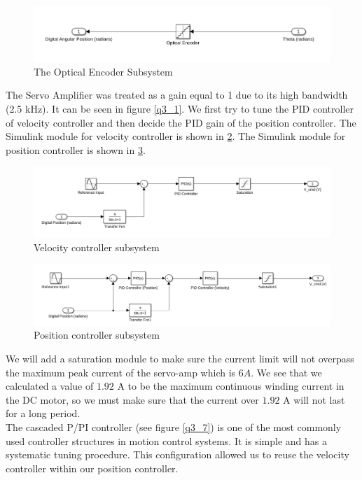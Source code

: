 \documentclass[letterpaper]{article}
\begin{document}
\begin{figure}[H]
\begin{center}
\includegraphics[scale = 0.36]{SensorSubsystem.png}
\caption{The Optical Encoder Subsystem}
\label{q3_3}
\end{center}
\end{figure}
The Servo Amplifier was treated as a gain equal to 1 due to its high bandwidth (2.5 kHz). It can be seen in figure \ref{q3_1}. We first try to tune the PID controller of velocity controller and then decide the PID gain of the position controller. The Simulink module for velocity controller is shown in \ref{q3_4}. The Simulink module for position controller is shown in \ref{q3_5}.
\begin{figure}[H]
	\centering
	\includegraphics[scale=0.32]{velocityControlSubsystem.png}
	\caption{Velocity controller subsystem}
	\label{q3_4}
\end{figure}
\begin{figure}[H]
	\centering
	\includegraphics[scale=0.36]{PositionControlSubsystem.png}
	\caption{Position controller subsystem}
	\label{q3_5}
\end{figure}
We will add a saturation module to make sure the current limit will not overpass the maximum peak current of the servo-amp which is $6A$. We see that we calculated a value of $1.92$ A to be the maximum continuous winding current in the DC motor, so we must make sure that the current over $1.92$ A will not last for a long period.\\

The cascaded P/PI controller (see figure \ref{q3_7}) is one of the most commonly used controller structures in motion control systems. It is simple and has a systematic tuning procedure. This configuration allowed us to reuse the velocity controller within our position controller.\\
\end{document}
